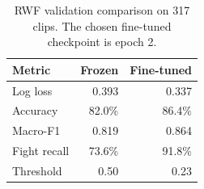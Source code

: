 \begin{table}[t]
\caption{RWF validation comparison on 317 clips. The chosen fine-tuned checkpoint is epoch 2.}
\label{tab:validation}\centering
\begin{tabular}{lrr}
\toprule
Metric & Frozen & Fine-tuned\\
\midrule
Log loss & 0.393 & 0.337\\
Accuracy & 82.0\% & 86.4\%\\
Macro-F1 & 0.819 & 0.864\\
Fight recall & 73.6\% & 91.8\%\\
Threshold & 0.50 & 0.23\\
\bottomrule
\end{tabular}
\end{table}
